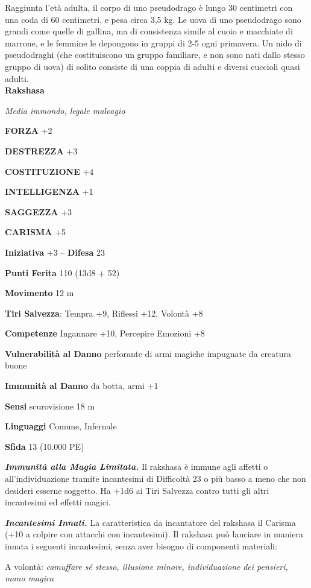 \begin{multicols}{2}
Raggiunta l'età adulta, il corpo di uno pseudodrago è lungo 30 centimetri con una coda di 60 centimetri, e pesa circa 3,5 kg. Le uova di uno pseudodrago sono grandi come quelle di gallina, ma di consistenza simile al cuoio e macchiate di marrone, e le femmine le depongono in gruppi di 2-5 ogni primavera. Un nido di pseudodraghi (che costituiscono un gruppo familiare, e non sono nati dallo stesso gruppo di uova) di solito consiste di una coppia di adulti e diversi cuccioli quasi adulti.\\


\medskip{}\textbf{Rakshasa}

\emph{Media immondo, legale malvagio}

\textbf{FORZA} +2

\textbf{DESTREZZA} +3

\textbf{COSTITUZIONE} +4

\textbf{INTELLIGENZA} +1

\textbf{SAGGEZZA} +3

\textbf{CARISMA} +5

\textbf{Iniziativa} +3 -- \textbf{Difesa} 23

\textbf{Punti Ferita} 110 (13d8 + 52)

\textbf{Movimento} 12 m

\textbf{Tiri Salvezza}: Tempra +9, Riflessi +12, Volontà +8 

\textbf{Competenze} Ingannare +10, Percepire Emozioni +8

\textbf{Vulnerabilità al Danno} perforante di armi magiche impugnate da
creatura buone

\textbf{Immunità al Danno} da botta, armi +1

\textbf{Sensi} scurovisione 18 m

\textbf{Linguaggi} Comune, Infernale

\textbf{Sfida} 13 (10.000 PE)

\emph{\textbf{Immunità alla Magia Limitata.}} Il rakshasa è immune agli affetti o all'individuazione tramite incantesimi di Difficoltà 23 o più basso a meno che non desideri esserne soggetto. Ha +1d6 ai Tiri Salvezza contro tutti gli altri incantesimi ed effetti magici.

\emph{\textbf{Incantesimi Innati.}} La caratteristica da incantatore del rakshasa il Carisma (+10 a colpire   con attacchi con incantesimi). Il rakshasa può lanciare in maniera innata i seguenti incantesimi, senza aver bisogno di componenti materiali:

A volontà: \emph{camuffare sé stesso, illusione minore, individuazione} \emph{dei pensieri, mano magica}


\end{multicols}
